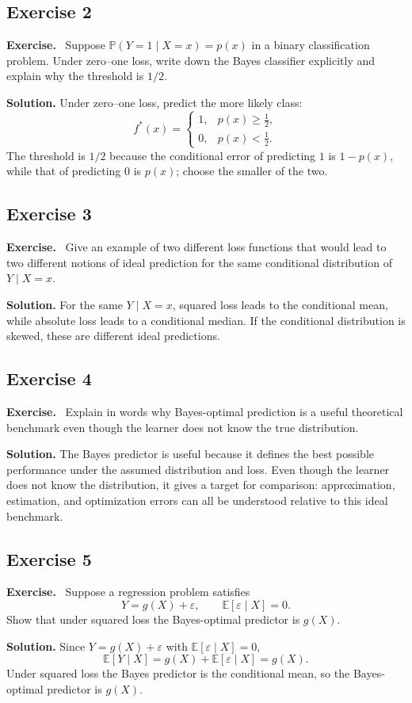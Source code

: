 \documentclass[11pt]{article}
\newenvironment{exercisebox}{\begin{framed}\noindent\textbf{Exercise.}\ }{\end{framed}}
\begin{document}
\subsection*{Exercise 2}
\begin{exercisebox}
Suppose $\mathbb P(Y=1\mid X=x)=p(x)$ in a binary classification problem. Under zero--one loss, write down the Bayes classifier explicitly and explain why the threshold is $1/2$.
\end{exercisebox}
\textbf{Solution.} Under zero--one loss, predict the more likely class:
\[
f^*(x)=\begin{cases}
1,&p(x)\ge \tfrac12,\\
0,&p(x)<\tfrac12.
\end{cases}
\]
The threshold is $1/2$ because the conditional error of predicting $1$ is $1-p(x)$, while that of predicting $0$ is $p(x)$; choose the smaller of the two.

\subsection*{Exercise 3}
\begin{exercisebox}
Give an example of two different loss functions that would lead to two different notions of ideal prediction for the same conditional distribution of $Y\mid X=x$.
\end{exercisebox}
\textbf{Solution.} For the same $Y\mid X=x$, squared loss leads to the conditional mean, while absolute loss leads to a conditional median. If the conditional distribution is skewed, these are different ideal predictions.

\subsection*{Exercise 4}
\begin{exercisebox}
Explain in words why Bayes-optimal prediction is a useful theoretical benchmark even though the learner does not know the true distribution.
\end{exercisebox}
\textbf{Solution.} The Bayes predictor is useful because it defines the best possible performance under the assumed distribution and loss. Even though the learner does not know the distribution, it gives a target for comparison: approximation, estimation, and optimization errors can all be understood relative to this ideal benchmark.

\subsection*{Exercise 5}
\begin{exercisebox}
Suppose a regression problem satisfies
\[
Y = g(X)+\varepsilon,
\qquad
\mathbb E[\varepsilon\mid X]=0.
\]
Show that under squared loss the Bayes-optimal predictor is $g(X)$.
\end{exercisebox}
\textbf{Solution.} Since $Y=g(X)+\varepsilon$ with $\mathbb E[\varepsilon\mid X]=0$,
\[
\mathbb E[Y\mid X]=g(X)+\mathbb E[\varepsilon\mid X]=g(X).
\]
Under squared loss the Bayes predictor is the conditional mean, so the Bayes-optimal predictor is $g(X)$.
\end{document}
